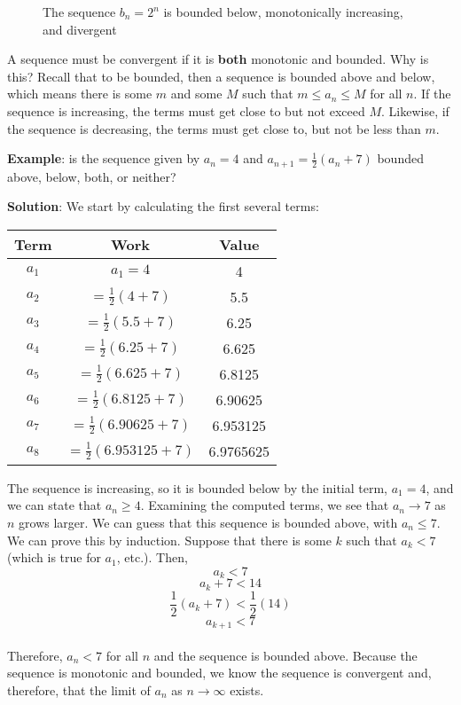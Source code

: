 \begin{figure}
    \centering
    \caption{The sequence $b_n = 2^n$ is bounded below, monotonically 
    increasing, and divergent}
    \label{fig:divexp}
\end{figure}

A sequence must be convergent if it is \textbf{both} monotonic and bounded. 
Why is this? Recall that to be bounded, then a sequence is bounded above and 
below, which means there is some $m$ and some $M$ such that $m \leq a_n \leq M$ 
for all $n$. If the sequence is increasing, the terms must get close to but not 
exceed $M$. Likewise, if the sequence is decreasing, the terms must get close 
to, but not be less than $m$.

\textbf{Example}: is the sequence given by $a_n = 4$ and $a_{n+1} = \frac{1}{2} 
(a_n + 7)$ bounded above, below, both, or neither?

\textbf{Solution}: We start by calculating the first several terms:
\begin{center}
	\begin{tabular}{|c|c|c|}\hline
	Term & Work & Value\\
	\hline
	$a_1$ & $a_1 = 4$ & 4\\
	\hline
	$a_2$ & $=\frac{1}{2}(4 + 7)$ & 5.5\\
	\hline
	$a_3$ & $=\frac{1}{2}(5.5+7)$ & 6.25\\
	\hline
	$a_4$ & $=\frac{1}{2}(6.25+7)$ & 6.625\\
	\hline
	$a_5$ & $=\frac{1}{2}(6.625+7)$ & 6.8125\\
	\hline
	$a_6$ & $=\frac{1}{2}(6.8125+7)$ & 6.90625\\
	\hline
	$a_7$ & $=\frac{1}{2}(6.90625+7)$ & 6.953125\\
	\hline
	$a_8$ & $=\frac{1}{2}(6.953125+7)$ & 6.9765625\\
	\hline	
	\end{tabular}
\end{center}

The sequence is increasing, so it is bounded below by the initial term, $a_1 = 
4$, and we can state that $a_n \geq 4$. Examining the computed terms, we see 
that $a_n \to 7$ as $n$ grows larger. We can guess that this sequence is 
bounded above, with $a_n \leq 7$. We can prove this by induction. Suppose that 
there is some $k$ such that $a_k < 7$ (which is true for $a_1$, etc.). Then,
$$a_k < 7$$
$$a_k + 7 < 14$$
$$\frac{1}{2}(a_k + 7) < \frac{1}{2}(14)$$
$$a_{k + 1} < 7$$\\
Therefore, $a_n < 7$ for all $n$ and the sequence is bounded above. Because 
the sequence is monotonic and bounded, we know the sequence is convergent and, 
therefore, that the limit of $a_n$ as $n \to \infty$ exists. 

